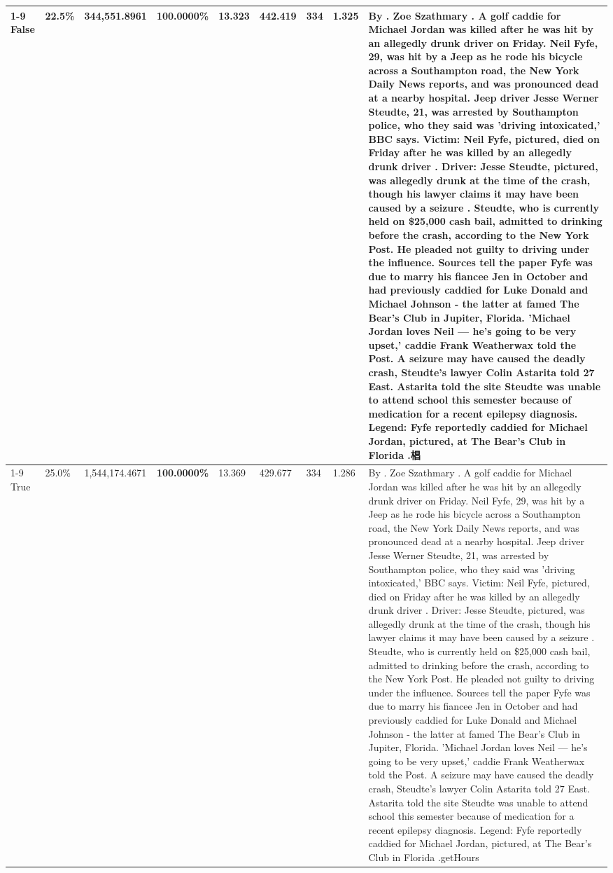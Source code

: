 \begin{table}[H]
\begin{tabular}{lllrlllll}
\cline{1-9}
False & 22.5\% & 344,551.8961 & \bfseries \color{red} 100.0000\% & 13.323 & 442.419 & 334 & 1.325 & By . Zoe Szathmary . A golf caddie for Michael Jordan was killed after he was hit by an allegedly drunk driver on Friday. Neil Fyfe, 29, was hit by a Jeep as he rode his bicycle across a Southampton road, the New York Daily News reports, and was pronounced dead at a nearby hospital. Jeep driver Jesse Werner Steudte, 21, was arrested by Southampton police, who they said was 'driving intoxicated,' BBC says. Victim: Neil Fyfe, pictured, died on Friday after he was killed by an allegedly drunk driver . Driver: Jesse Steudte, pictured, was allegedly drunk at the time of the crash, though his lawyer claims it may have been caused by a seizure . Steudte, who is currently held on \$25,000 cash bail, admitted to drinking before the crash, according to the New York Post. He pleaded not guilty to driving under the influence. Sources tell the paper Fyfe was due to marry his fiancee Jen in October and had previously caddied for Luke Donald and Michael Johnson - the latter at famed The Bear's Club in Jupiter, Florida. 'Michael Jordan loves Neil — he’s going to be very upset,' caddie Frank Weatherwax told the Post. A seizure may have caused the deadly crash, Steudte's lawyer Colin Astarita told 27 East. Astarita told the site Steudte was unable to attend school this semester because of medication for a recent epilepsy diagnosis. Legend: Fyfe reportedly caddied for Michael Jordan, pictured, at The Bear's Club in Florida .椙 \\
\cline{1-9}
True & 25.0\% & 1,544,174.4671 & \bfseries \color{red} 100.0000\% & 13.369 & 429.677 & 334 & 1.286 & By . Zoe Szathmary . A golf caddie for Michael Jordan was killed after he was hit by an allegedly drunk driver on Friday. Neil Fyfe, 29, was hit by a Jeep as he rode his bicycle across a Southampton road, the New York Daily News reports, and was pronounced dead at a nearby hospital. Jeep driver Jesse Werner Steudte, 21, was arrested by Southampton police, who they said was 'driving intoxicated,' BBC says. Victim: Neil Fyfe, pictured, died on Friday after he was killed by an allegedly drunk driver . Driver: Jesse Steudte, pictured, was allegedly drunk at the time of the crash, though his lawyer claims it may have been caused by a seizure . Steudte, who is currently held on \$25,000 cash bail, admitted to drinking before the crash, according to the New York Post. He pleaded not guilty to driving under the influence. Sources tell the paper Fyfe was due to marry his fiancee Jen in October and had previously caddied for Luke Donald and Michael Johnson - the latter at famed The Bear's Club in Jupiter, Florida. 'Michael Jordan loves Neil — he’s going to be very upset,' caddie Frank Weatherwax told the Post. A seizure may have caused the deadly crash, Steudte's lawyer Colin Astarita told 27 East. Astarita told the site Steudte was unable to attend school this semester because of medication for a recent epilepsy diagnosis. Legend: Fyfe reportedly caddied for Michael Jordan, pictured, at The Bear's Club in Florida .getHours \\

\end{tabular}
\end{table}

